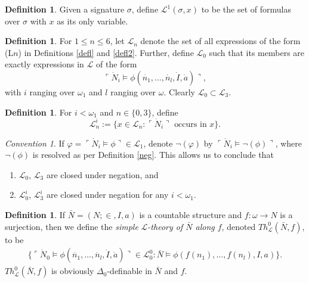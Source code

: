 \documentclass[12pt, twoside]{memoir}
\numberwithin{equation}{section}
\theoremstyle{definition}
\newtheorem{defi}[thm]{Definition}
\theoremstyle{remark}
\newtheorem{con}[thm]{Convention}
\theoremstyle{definition}
\theoremstyle{definition}
\theoremstyle{definition}
\theoremstyle{remark}
\begin{document}
\begin{defi}\label{defsvf}
Given a signature $\sigma$, define $\mathcal{L}^1(\sigma, x)$ to be the set of formulas over $\sigma$ with $x$ as its only variable.
\end{defi}

\begin{defi}\label{subn}
For $1 \leq n \leq 6$, let $\mathcal{L}_n$ denote the set of all expressions of the form (L$n$) in Definitions \ref{defl} and \ref{defl2}. Further, define $\mathcal{L}_0$ such that its members are exactly expressions in $\mathcal{L}$ of the form 
\begin{equation*}
    \ulcorner \dot{N}_i \models \phi(\dot{n_1}, \ldots, \dot{n_l}, \dot{I}, \dot{a}) \urcorner,
\end{equation*}
with $i$ ranging over $\omega_1$ and $l$ ranging over $\omega$. Clearly $\mathcal{L}_0 \subset \mathcal{L}_3$.
\end{defi}

\begin{defi}
For $i < \omega_1$ and $n \in \{0, 3\}$, define 
\begin{equation*}
    \mathcal{L}^i_n := \{x \in \mathcal{L}_n : \ulcorner \dot{N}_i \urcorner \text{ occurs in } x\}.
\end{equation*}
\end{defi}

\begin{con}
If $\varphi = \ulcorner \dot{N}_i \models \phi \urcorner \in \mathcal{L}_1$, denote $\neg(\varphi)$ by $\ulcorner \dot{N}_i \models \neg(\phi) \urcorner$, where $\neg(\phi)$ is resolved as per Definition \ref{neg}. This allows us to conclude that 
\begin{enumerate}[label=(\alph*)]
    \item $\mathcal{L}_0$, $\mathcal{L}_3$ are closed under negation, and
    \item $\mathcal{L}^i_0$, $\mathcal{L}^i_3$ are closed under negation for any $i < \omega_1$.
\end{enumerate}
\end{con}

\begin{defi}
If $\bar{N} = (N; \in, I, a)$ is a countable structure and $f : \omega \longrightarrow N$ is a surjection, then we define the \emph{simple} $\mathcal{L}$\emph{-theory of $\bar{N}$ along $f$}, denoted $Th^{0}_{\mathcal{L}}(\bar{N}, f)$, to be 
\begin{align*}
    \{\ulcorner \dot{N}_0 \models \phi(\dot{n_1}, \ldots, \dot{n_l}, \dot{I}, \dot{a}) \urcorner \in \mathcal{L}^0_0 : \bar{N} \models \phi(f(n_1), \ldots, f(n_l), I, a)\}.
\end{align*}
$Th^{0}_{\mathcal{L}}(\bar{N}, f)$ is obviously $\Delta_0$-definable in $\bar{N}$ and $f$.
\end{defi}
\end{document}
